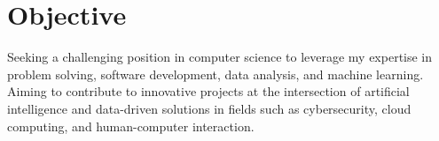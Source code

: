 \section{\textbf{Objective}}
\vspace{1mm}
\small{
Seeking a challenging position in computer science to leverage my expertise in problem solving, software development, data analysis, and machine learning. Aiming to contribute to innovative projects at the intersection of artificial intelligence and data-driven solutions in fields such as cybersecurity, cloud computing, and human-computer interaction.
}
